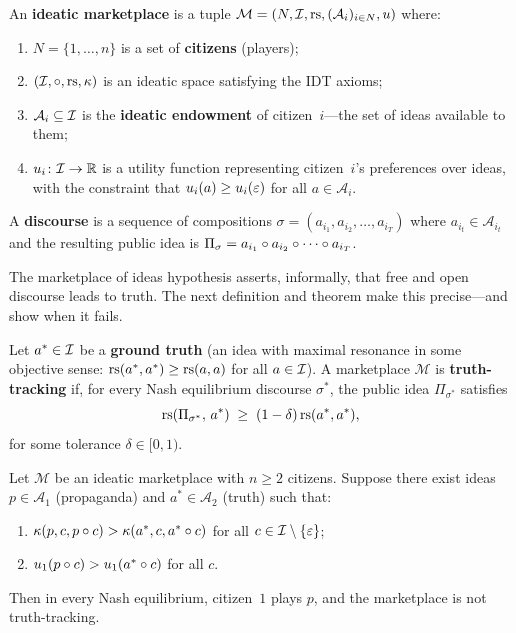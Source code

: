 \begin{definition}
\label{def:marketplace}
An \textbf{ideatic marketplace} is a tuple
$\mathcal{M} = (N, \mathcal{I}, \mathrm{rs}, (\mathcal{A}_i)_{i \in N}, u)$ where:
\begin{enumerate}[label=(\roman*)]
  \item $N = \{1,\ldots,n\}$ is a set of \textbf{citizens} (players);
  \item $(\mathcal{I}, \circ, \mathrm{rs}, \kappa)$ is an ideatic space
    satisfying the IDT axioms;
  \item $\mathcal{A}_i \subseteq \mathcal{I}$ is the \textbf{ideatic endowment}
    of citizen~$i$---the set of ideas available to them;
  \item $u_i \colon \mathcal{I} \to \mathbb{R}$ is a utility function representing
    citizen~$i$'s preferences over ideas, with the constraint that
    $u_i(a) \ge u_i(\varepsilon)$ for all $a \in \mathcal{A}_i$.
\end{enumerate}
A \textbf{discourse} is a sequence of compositions
$\sigma = (a_{i_1}, a_{i_2}, \ldots, a_{i_T})$ where
$a_{i_t} \in \mathcal{A}_{i_t}$ and the resulting public idea is
$\Pi_\sigma = a_{i_1} \circ a_{i_2} \circ \cdots \circ a_{i_T}$.
\end{definition}

The marketplace of ideas hypothesis asserts, informally, that free
and open discourse leads to truth.  The next definition and theorem
make this precise---and show when it fails.

\begin{definition}
\label{def:truth-tracking}
Let $a^* \in \mathcal{I}$ be a \textbf{ground truth} (an idea with maximal
resonance in some objective sense: $\mathrm{rs}(a^*,a^*) \ge \mathrm{rs}(a,a)$
for all $a \in \mathcal{I}$).  A marketplace $\mathcal{M}$ is
\textbf{truth-tracking} if, for every Nash equilibrium discourse
$\sigma^*$, the public idea $\Pi_{\sigma^*}$ satisfies
\[
  \mathrm{rs}(\Pi_{\sigma^*},\, a^*) \;\ge\;
  (1-\delta)\,\mathrm{rs}(a^*,a^*),
\]
for some tolerance $\delta \in [0,1)$.
\end{definition}

\begin{theorem}
\label{thm:marketplace-failure}
Let $\mathcal{M}$ be an ideatic marketplace with $n \ge 2$ citizens.
Suppose there exist ideas $p \in \mathcal{A}_1$ (propaganda) and
$a^* \in \mathcal{A}_2$ (truth) such that:
\begin{enumerate}[label=(\alph*)]
  \item $\kappa(p, c, p \circ c) > \kappa(a^*, c, a^* \circ c)$
    for all $c \in \mathcal{I} \setminus \{\varepsilon\}$;
  \item $u_1(p \circ c) > u_1(a^* \circ c)$ for all $c$.
\end{enumerate}
Then in every Nash equilibrium, citizen~$1$ plays $p$, and the
marketplace is not truth-tracking.
\end{theorem}


